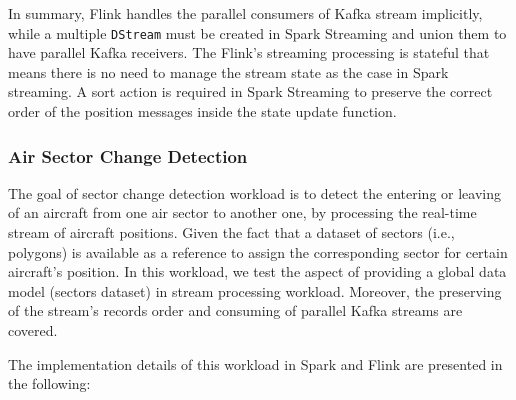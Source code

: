 \documentclass[]{article}
\begin{document}
\begin{itemize}
\end{itemize}

\par In summary, Flink  handles  the parallel consumers of Kafka stream implicitly, while a multiple \texttt{DStream} must be created in Spark Streaming and union them to have parallel Kafka receivers. The Flink's streaming processing is stateful that means there is no need to manage the stream state as the case in Spark streaming. A sort action is required in Spark Streaming to preserve the correct  order of the position messages inside the state update function.

\subsubsection{Air Sector Change Detection}

The goal of sector change detection workload is to detect the  entering or leaving of an aircraft from one air sector to another one, by processing the real-time stream of aircraft positions. Given the fact that a dataset of sectors (i.e., polygons) is available as a reference to assign the corresponding sector for certain aircraft's position. In this workload, we test the aspect of providing a global data model (sectors dataset) in stream processing workload. Moreover, the preserving of the stream's records order and consuming of parallel Kafka streams  are covered.
 
 The implementation details of this workload in Spark and Flink are presented in the following: 
 
\end{document}
